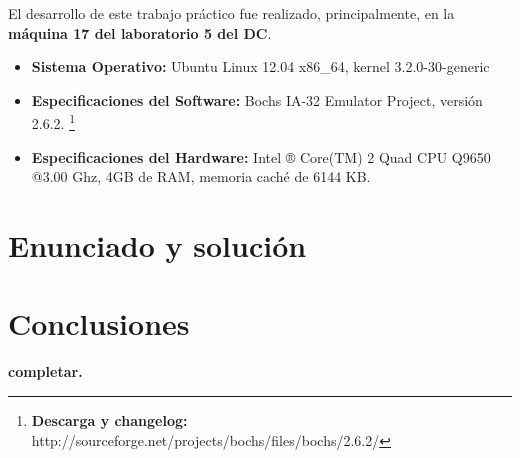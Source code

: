 \documentclass[a4paper]{article}
\begin{document}
\vspace{1cm}


\noindent El desarrollo de este trabajo práctico fue realizado, principalmente, en la \textbf{máquina 17 del laboratorio 5 del DC}. \newline

\begin{itemize}
  \item \textbf{Sistema Operativo:} Ubuntu Linux 12.04 x86_64, kernel 3.2.0-30-generic

  \item \textbf{Especificaciones del Software:} Bochs IA-32 Emulator Project, versión 2.6.2. \footnote{\textbf{Descarga y changelog:} http://sourceforge.net/projects/bochs/files/bochs/2.6.2/}

  \item \textbf{Especificaciones del Hardware:} Intel ® Core(TM) 2 Quad CPU Q9650 @3.00 Ghz, 4GB de RAM, memoria caché de 6144 KB.
\end{itemize}



\newpage



 

\section{Enunciado y soluci\'on} 



\section{Conclusiones}


\textbf{completar.}
\end{document}
